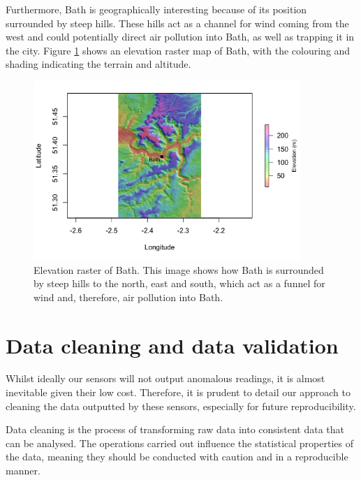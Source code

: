 \documentclass[11pt]{report}
\begin{document}

Furthermore, Bath is geographically interesting because of its position surrounded by steep hills. These hills act as a channel for wind coming from the west and could potentially direct air pollution into Bath, as well as trapping it in the city. Figure \ref{bath_elevation} shows an elevation raster map of Bath, with the colouring and shading indicating the terrain and altitude.

\begin{figure}[!htb]
\centering
\includegraphics[width=0.9\textwidth]{images/bath_elevation_large}
\caption{Elevation raster of Bath. This image shows how Bath is surrounded by steep hills to the north, east and south, which act as a funnel for wind and, therefore, air pollution into Bath.}
\label{bath_elevation}
\end{figure}

\section{Data cleaning and data validation}

Whilst ideally our sensors will not output anomalous readings, it is almost inevitable given their low cost. Therefore, it is prudent to detail our approach to cleaning the data outputted by these sensors, especially for future reproducibility.

Data cleaning is the process of transforming raw data into consistent data that can be analysed. The operations carried out influence the statistical properties of the data, meaning they should be conducted with caution and in a reproducible manner.

\end{document}

